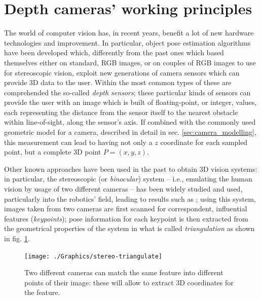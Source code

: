 \section{Depth cameras' working principles}

The world of computer vision has, in recent years, benefit a lot of new hardware
technologies and improvement. In particular, object pose estimation algorithms
have been developed which, differently from the past ones which based themselves
either on standard, RGB images, or on couples of RGB images to use for
stereoscopic vision, exploit new generations of camera sensors which can provide
3D data to the user. Within the most common types of these are comprehended the
so-called \emph{depth sensors}; these particular kinds of sensors can provide
the user with an image which is built of floating-point, or integer, values,
each representing the distance from the sensor itself to the nearest obstacle
within line-of-sight, along the sensor's axis. If combined with the commonly
used geometric model for a camera, described in detail in sec.
\ref{sec:camera_modelling}, this measurement can lead to having not only a $z$
coordinate for each sampled point, but a complete 3D point $P=(x,y,z)$.

Other known approaches have been used in the past to obtain 3D vision systems:
in particular, the stereoscopic (or \emph{binocular}) system -- i.e., emulating the human vision by usage
of two different cameras -- has been widely studied and used, particularly into
the robotics' field, leading to
results such as \cite{stereo-vision-robot}; using this system, images taken
from two cameras are first scanned for correspondent, influential features
(\emph{keypoints}); pose information for each keypoint is then extracted from
the geometrical properties of the system in what is called \emph{triangulation}
as shown in fig. \ref{fig:stereo-triangulate}.

\begin{figure}[htbp]
\centering
\texttt{[image: ./Graphics/stereo-triangulate]}
\caption{Two different cameras can match the same feature into different points
of their image: these will allow to extract 3D coordinates for the feature.\label{fig:stereo-triangulate}}
\end{figure}

